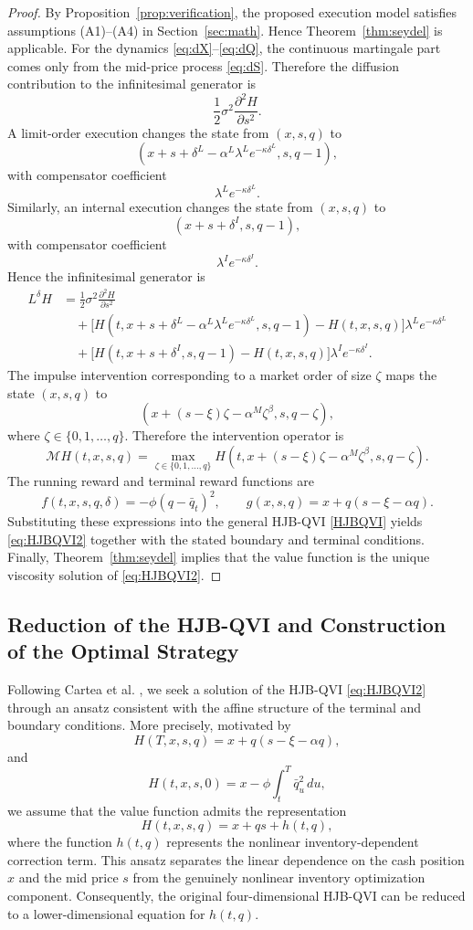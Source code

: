 \documentclass[12pt]{article}
\begin{document}
\begin{proof}
By Proposition~\ref{prop:verification}, the proposed execution model satisfies assumptions (A1)--(A4) in Section~\ref{sec:math}. Hence Theorem~\ref{thm:seydel} is applicable.
For the dynamics \eqref{eq:dX}--\eqref{eq:dQ}, the continuous martingale part comes only from the mid-price process \eqref{eq:dS}. Therefore the diffusion contribution to the infinitesimal generator is
\[
\frac{1}{2}\sigma^2\frac{\partial^2H}{\partial s^2}.
\]
A limit-order execution changes the state from $(x,s,q)$ to
\[
(x+s+\delta^L-\alpha^L\lambda^L e^{-\kappa\delta^L},s,q-1),
\]
with compensator coefficient
\[
\lambda^L e^{-\kappa\delta^L}.
\]
Similarly, an internal execution changes the state from $(x,s,q)$ to
\[
(x+s+\delta^I,s,q-1),
\]
with compensator coefficient
\[
\lambda^I e^{-\kappa\delta^I}.
\]
Hence the infinitesimal generator is
\begin{align*}
L^\delta H
&=
\frac{1}{2}\sigma^2\frac{\partial^2H}{\partial s^2}
\\
&\quad+
\bigl[
H(t,x+s+\delta^L-\alpha^L\lambda^L e^{-\kappa\delta^L},s,q-1)
-
H(t,x,s,q)
\bigr]
\lambda^L e^{-\kappa\delta^L}
\\
&\quad+
\bigl[
H(t,x+s+\delta^I,s,q-1)
-
H(t,x,s,q)
\bigr]
\lambda^I e^{-\kappa\delta^I}.
\end{align*}
The impulse intervention corresponding to a market order of size $\zeta$
maps the state $(x,s,q)$ to
\[
(x+(s-\xi)\zeta-\alpha^M\zeta^\beta,s,q-\zeta),
\]
where $\zeta\in\{0,1,\ldots,q\}$.
Therefore the intervention operator is
\[
\mathcal{M}H(t,x,s,q)
=
\max_{\zeta\in\{0,1,\ldots,q\}}
H(t,x+(s-\xi)\zeta-\alpha^M\zeta^\beta,s,q-\zeta).
\]
The running reward and terminal reward functions are
\[
f(t,x,s,q,\delta)
=
-\phi(q-\bar q_t)^2,
\qquad
g(x,s,q)
=
x+q(s-\xi-\alpha q).
\]
Substituting these expressions into the general HJB-QVI
\eqref{HJBQVI}
yields \eqref{eq:HJBQVI2} together with the stated boundary and terminal conditions.
Finally, Theorem~\ref{thm:seydel} implies that the value function is the unique viscosity solution of \eqref{eq:HJBQVI2}.
\end{proof}

\subsection{Reduction of the HJB-QVI and Construction of the Optimal Strategy}

Following Cartea et al. \cite{cartea2015algorithmic},
we seek a solution of the HJB-QVI
\eqref{eq:HJBQVI2}
through an ansatz consistent with the affine structure of the terminal and boundary conditions.
More precisely, motivated by
\[
H(T,x,s,q)
=
x+q(s-\xi-\alpha q),
\]
and
\[
H(t,x,s,0)
=
x
-
\phi
\int_t^T
\bar q_u^2\,du,
\]
we assume that the value function admits the representation
\[
H(t,x,s,q)
=
x+qs+h(t,q),
\]
where the function $h(t,q)$ represents the nonlinear inventory-dependent correction term.
This ansatz separates the linear dependence on the cash position $x$
and the mid price $s$
from the genuinely nonlinear inventory optimization component. Consequently, the original four-dimensional HJB-QVI
can be reduced to a lower-dimensional equation for $h(t,q)$.
\end{document}
